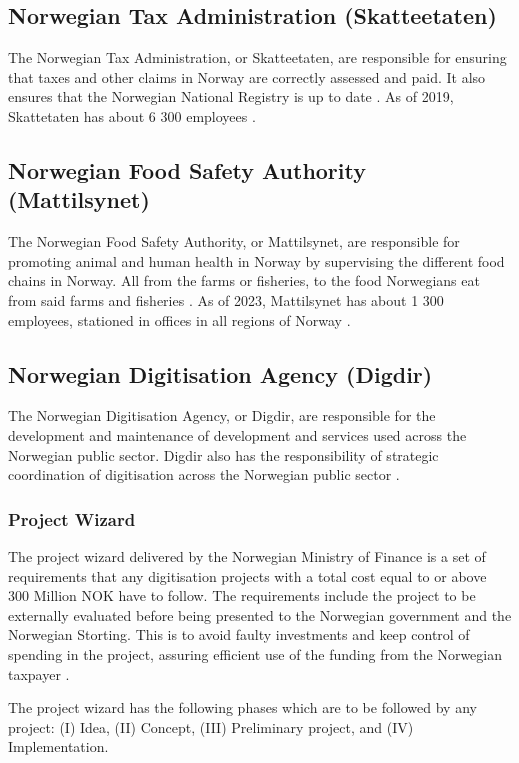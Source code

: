 \subsection{Norwegian Tax Administration (Skatteetaten)}
The Norwegian Tax Administration, or Skatteetaten, are responsible for ensuring that taxes and other claims in Norway are correctly assessed and paid. It also ensures that the Norwegian National Registry is up to date \cite{skatt_r_2023}. As of 2019, Skattetaten has about 6 300 employees \cite{skatt_r_2023}. 

\subsection{Norwegian Food Safety Authority (Mattilsynet)}
The Norwegian Food Safety Authority, or Mattilsynet, are responsible for promoting animal and human health in Norway by supervising the different food chains in Norway. All from the farms or fisheries, to the food Norwegians eat from said farms and fisheries \cite{mat_r_2023}. As of 2023, Mattilsynet has about 1 300 employees, stationed in offices in all regions of Norway \cite{org_mat_2023}.

\subsection{Norwegian Digitisation Agency (Digdir)}
The Norwegian Digitisation Agency, or Digdir, are responsible for the development and maintenance of development and services used across the Norwegian public sector. Digdir also has the responsibility of strategic coordination of digitisation across the Norwegian public sector \cite{digdir_r_2023}.

\subsubsection{Project Wizard}
The project wizard delivered by the Norwegian Ministry of Finance is a set of requirements that any digitisation projects with a total cost equal to or above 300 Million NOK have to follow. The requirements include the project to be externally evaluated before being presented to the Norwegian government and the Norwegian Storting. This is to avoid faulty investments and keep control of spending in the project, assuring efficient use of the funding from the Norwegian taxpayer \cite{project_wizard_r_2019}.

The project wizard has the following phases which are to be followed by any project: (I) Idea, (II) Concept, (III) Preliminary project, and (IV) Implementation.

